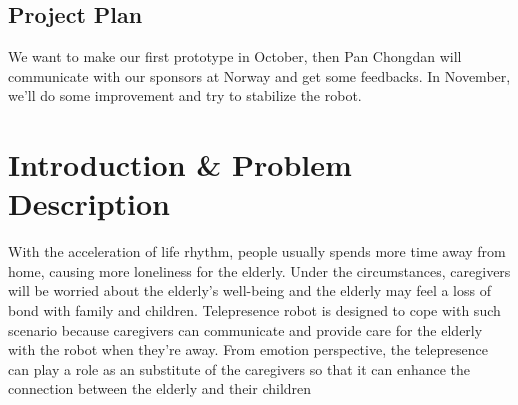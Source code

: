 \documentclass[12pt]{article}
\begin{document}
\subsection{Project Plan}
We want to make our first prototype in October, then Pan Chongdan will communicate with our sponsors at Norway and get some feedbacks. In November, we'll do some improvement and try to stabilize the robot.
\section{Introduction \& Problem Description }
With the acceleration of life rhythm, people usually spends more time away from home, causing more loneliness for the elderly. Under the circumstances, caregivers will be worried about the elderly's well-being and the elderly may feel a loss of bond with family and children. Telepresence robot is designed to cope with such scenario because caregivers can communicate and provide care for the elderly with the robot when they're away. From emotion perspective, the telepresence can play a role as an substitute of the caregivers so that it can enhance the connection between the elderly and their children
\end{document}
